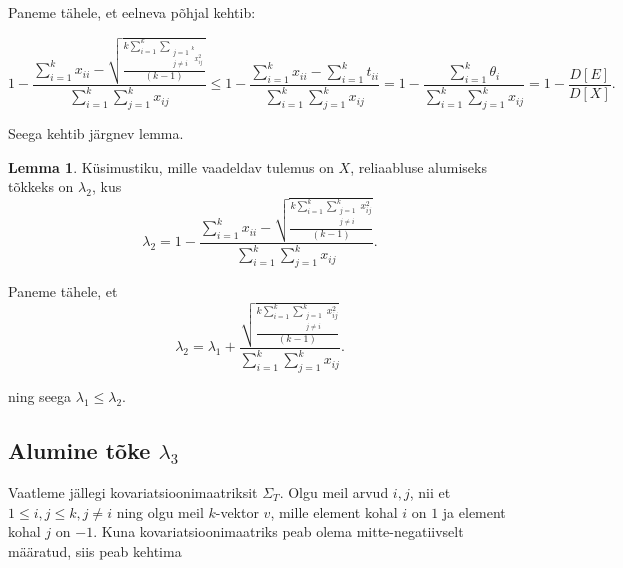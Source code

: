 \documentclass[a4paper,12pt,oneside]{article}
\newcounter{lemma}[section]
\numberwithin{equation}{section}
\theoremstyle{definition}
\newtheorem{lambda_2}[lemma]{Lemma}
\begin{document}
Paneme tähele, et eelneva põhjal kehtib:


\begin{equation*}
 1 - \frac{\sum \limits_{i=1}^k x_{ii} - \sqrt{\frac{ k \sum \limits_{i=1}^k   \sum \limits_{\substack{j=1 \\ j \neq i}^{k} x_{ij}^2 }}{\left( k -1 \right)}}}{\sum \limits_{i=1}^k \sum \limits_{j=1}^k x_{ij}} \leq 1 - \frac{\sum \limits_{i=1}^k x_{ii}- \sum \limits_{i=1}^k t_{ii}}{\sum \limits_{i=1}^k \sum \limits_{j=1}^k x_{ij}} =   1 - \frac{\sum \limits_{i=1}^k \theta_i}{\sum \limits_{i=1}^k \sum \limits_{j=1}^k x_{ij}} =  1 - \frac{D \left[ E \right]}{D \left[ X \right]} \text{.}
\end{equation*}


Seega kehtib järgnev  lemma.

\begin{lambda_2}
Küsimustiku, mille vaadeldav tulemus on $X$, reliaabluse alumiseks tõkkeks on $\lambda_2$, kus 
\begin{equation*}
\lambda_2 = 1 - \frac{\sum \limits_{i=1}^k x_{ii} - \sqrt{\frac{ k \sum \limits_{i=1}^k   \sum \limits_{\substack{j=1 \\ j \neq i}}^{k} x_{ij}^2 }{\left( k -1 \right)}}}{\sum \limits_{i=1}^k \sum \limits_{j=1}^k x_{ij}}  \text{.}
\end{equation*}
\end{lambda_2}



Paneme tähele, et 
\begin{equation*}
\lambda_2 = \lambda_1 + \frac{\sqrt{\frac{ k \sum \limits_{i=1}^k   \sum \limits_{\substack{j=1 \\j \neq i}}^{k} x_{ij}^2 }{\left( k -1 \right)}}}{\sum \limits_{i=1}^k \sum \limits_{j=1}^k x_{ij}} \text{.}
\end{equation*}

ning seega $\lambda_1 \leq \lambda_2$.

\subsection{Alumine tõke $\lambda_3$}



Vaatleme jällegi kovariatsioonimaatriksit $\Sigma_T$. Olgu meil arvud $i,j$, nii et $1 \leq i,j  \leq k, j \neq i$ ning olgu meil $k$-vektor $v$, mille element kohal $i$ on $1$ ja element kohal $j$ on $-1$. Kuna kovariatsioonimaatriks peab olema mitte-negatiivselt määratud, siis peab kehtima
\end{document}
